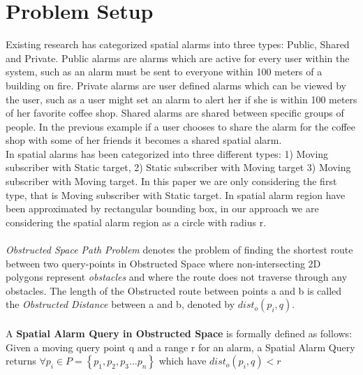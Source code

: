 \section{Problem Setup}
Existing research has categorized spatial alarms into three types: Public, Shared and Private. Public alarms are alarms which are active for every user within the system, such as an alarm must be sent to everyone within 100 meters of a building on fire. Private alarms are user defined alarms which can be viewed by the user, such as a user might set an alarm to alert her if she is within 100 meters of her favorite coffee shop. Shared alarms are shared between specific groups of people. In the previous example if a user chooses to share the alarm for the coffee shop with some of her friends it becomes a shared spatial alarm.\\
In \cite{bamba} spatial alarms has been categorized into three different types: 1) Moving subscriber with Static target, 2) Static subscriber with Moving target 3) Moving subscriber with Moving target. In this paper we are only considering the first type, that is Moving subscriber with Static target. 
In \cite{mur} spatial alarm region have been approximated by rectangular bounding box, in our approach we are considering the spatial alarm region as a circle with radius r.\\ \\
\textit{Obstructed Space Path Problem} \cite{ognn} denotes the problem of finding the shortest route between two query-points  in Obstructed Space where non-intersecting 2D polygons represent \textit{obstacles} and where the route does not traverse through any obstacles. The length of the Obstructed route between points a and b is called the \textit{Obstructed Distance} between a and b, denoted by $dist_o(p_i,q)$.\\ \\
A \textbf{Spatial Alarm Query in Obstructed Space} is formally defined as follows:
Given a moving query point q and a range r for an alarm, a Spatial Alarm Query returns $\forall p_i \in P=\left\lbrace p_1,p_2,p_3...p_n\right\rbrace  $ which have $dist_o(p_i,q)<r $

